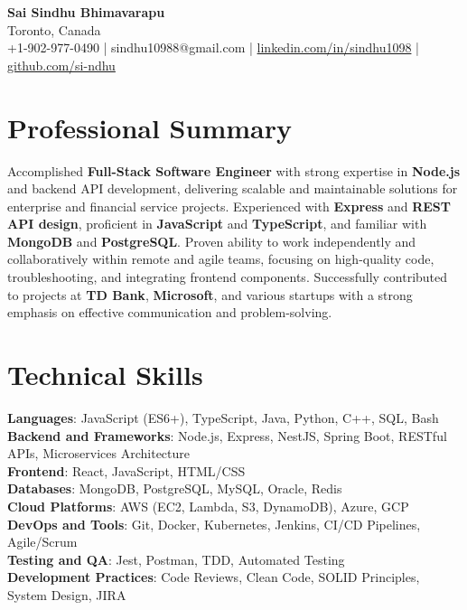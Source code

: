\documentclass[letterpaper,11pt]{article}
\begin{document}
\begin{center}
  {\Large \textbf{Sai Sindhu Bhimavarapu}} \\
  Toronto, Canada \\
  +1-902-977-0490 \enspace | \enspace sindhu10988@gmail.com \enspace | \enspace \href{https://www.linkedin.com/in/sindhu1098/}{linkedin.com/in/sindhu1098} \enspace | \enspace \href{https://github.com/si-ndhu}{github.com/si-ndhu}
\end{center}

\section{Professional Summary}
  \begin{itemize}[leftmargin=0.15in, label={}]
    \small{\item{
     Accomplished \textbf{Full-Stack Software Engineer} with strong expertise in \textbf{Node.js} and backend API development, delivering scalable and maintainable solutions for enterprise and financial service projects. Experienced with \textbf{Express} and \textbf{REST API design}, proficient in \textbf{JavaScript} and \textbf{TypeScript}, and familiar with \textbf{MongoDB} and \textbf{PostgreSQL}. Proven ability to work independently and collaboratively within remote and agile teams, focusing on high-quality code, troubleshooting, and integrating frontend components. Successfully contributed to projects at \textbf{TD Bank}, \textbf{Microsoft}, and various startups with a strong emphasis on effective communication and problem-solving.
    }}
  \end{itemize}
\vspace{-16pt}

\section{Technical Skills}
 \begin{itemize}[leftmargin=0.15in, label={}]
    \small{\item{
     \textbf{Languages}: JavaScript (ES6+), TypeScript, Java, Python, C++, SQL, Bash \\
     \textbf{Backend and Frameworks}: Node.js, Express, NestJS, Spring Boot, RESTful APIs, Microservices Architecture \\
     \textbf{Frontend}: React, JavaScript, HTML/CSS \\
     \textbf{Databases}: MongoDB, PostgreSQL, MySQL, Oracle, Redis \\
     \textbf{Cloud Platforms}: AWS (EC2, Lambda, S3, DynamoDB), Azure, GCP \\
     \textbf{DevOps and Tools}: Git, Docker, Kubernetes, Jenkins, CI/CD Pipelines, Agile/Scrum \\
     \textbf{Testing and QA}: Jest, Postman, TDD, Automated Testing \\
     \textbf{Development Practices}: Code Reviews, Clean Code, SOLID Principles, System Design, JIRA
    }}
 \end{itemize}
\vspace{-16pt}
\end{document}
